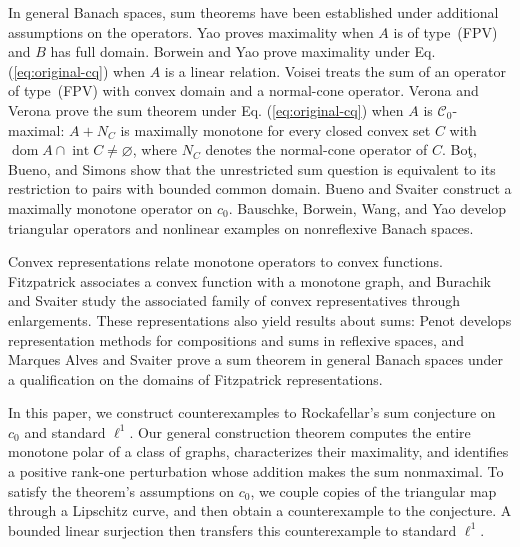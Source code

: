 \documentclass[11pt]{article}
\newcommand{\dom}{\operatorname{dom}}
\theoremstyle{definition}
\theoremstyle{remark}
\begin{document}
In general Banach spaces, sum theorems have been established under additional assumptions on the operators. Yao \cite{yao2010} proves maximality when $A$ is of type~(FPV) and $B$ has full domain. Borwein and Yao \cite{borweinyao2012} prove maximality under Eq. (\ref{eq:original-cq}) when $A$ is a linear relation. Voisei \cite{voisei2010} treats the sum of an operator of type~(FPV) with convex domain and a normal-cone operator. Verona and Verona \cite[Main Result~1.1(b)]{veronaverona2022} prove the sum theorem under Eq. (\ref{eq:original-cq}) when $A$ is $\mathcal C_0$-maximal: $A+N_C$ is maximally monotone for every closed convex set $C$ with $\dom A\cap\operatorname{int}C\ne\varnothing$, where $N_C$ denotes the normal-cone operator of $C$. Bo\c{t}, Bueno, and Simons \cite{botbuenosimons2016} show that the unrestricted sum question is equivalent to its restriction to pairs with bounded common domain. Bueno and Svaiter \cite{buenosvaiter2011} construct a maximally monotone operator on $c_0$. Bauschke, Borwein, Wang, and Yao \cite{bauschkeetal2011} develop triangular operators and nonlinear examples on nonreflexive Banach spaces. 

Convex representations relate monotone operators to convex functions. Fitzpatrick \cite{fitzpatrick1988} associates a convex function with a monotone graph, and Burachik and Svaiter \cite{burachiksvaiter2002} study the associated family of convex representatives through enlargements. These representations also yield results about sums: Penot \cite{penot2004} develops representation methods for compositions and sums in reflexive spaces, and Marques Alves and Svaiter \cite{marquessvaiter2012} prove a sum theorem in general Banach spaces under a qualification on the domains of Fitzpatrick representations.


In this paper, we construct counterexamples to Rockafellar's sum conjecture on $c_0$ and standard $\ell^1$. Our general construction theorem computes the entire monotone polar of a class of graphs, characterizes their maximality, and identifies a positive rank-one perturbation whose addition makes the sum nonmaximal. To satisfy the theorem's assumptions on $c_0$, we couple copies of the triangular map through a Lipschitz curve, and then obtain a counterexample to the conjecture. A bounded linear surjection then transfers this counterexample to standard $\ell^1$.
\end{document}
